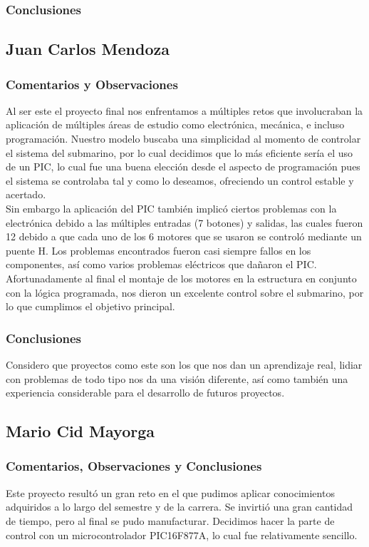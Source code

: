 \subsubsection{Conclusiones}

\subsection{Juan Carlos Mendoza}
\subsubsection{Comentarios y Observaciones}
Al ser este el proyecto final nos enfrentamos a m\'ultiples retos que involucraban la aplicaci\'on de m\'ultiples \'areas de
estudio como electr\'onica, mec\'anica, e incluso programaci\'on. Nuestro modelo buscaba una simplicidad al momento de
controlar el sistema del submarino, por lo cual decidimos que lo m\'as eficiente ser\'ia el uso de un PIC, lo cual fue una
buena elecci\'on desde el aspecto de programaci\'on pues el sistema se controlaba tal y como lo deseamos, ofreciendo un control
estable y acertado.\\

Sin embargo la aplicaci\'on del PIC tambi\'en implic\'o ciertos problemas con la electr\'onica debido a las
m\'ultiples entradas (7 botones) y salidas, las cuales fueron 12 debido a que cada uno de los 6 motores que se usaron se
control\'o mediante un puente H. Los problemas encontrados fueron casi siempre fallos en los componentes, as\'i como varios
problemas el\'ectricos que da\~naron el PIC. Afortunadamente al final el montaje de los motores en la estructura en conjunto
con la l\'ogica programada, nos dieron un excelente control sobre el submarino, por lo que cumplimos el objetivo principal.

\subsubsection{Conclusiones}
Considero que proyectos como este son los que nos dan un aprendizaje real, lidiar con problemas de todo tipo nos da una
visi\'on diferente, as\'i como tambi\'en una experiencia considerable para el desarrollo de futuros proyectos.

\subsection{Mario Cid Mayorga}
\subsubsection{Comentarios, Observaciones y Conclusiones}
Este proyecto result\'o un gran reto en el que pudimos aplicar conocimientos adquiridos a lo largo del semestre y
de la carrera. Se invirti\'o una gran cantidad de tiempo, pero al final se pudo manufacturar. Decidimos hacer la
parte de control con un microcontrolador PIC16F877A, lo cual fue relativamente sencillo. \\

